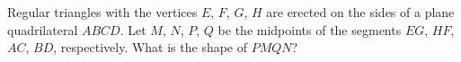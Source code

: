 Regular triangles with the vertices $E$, $F$, $G$, $H$ are erected on the sides of a plane quadrilateral $ABCD$. Let $M$, $N$, $P$, $Q$ be the midpoints of the segments $EG$, $HF$, $AC$, $BD$, respectively. What is the shape of $PMQN$?
